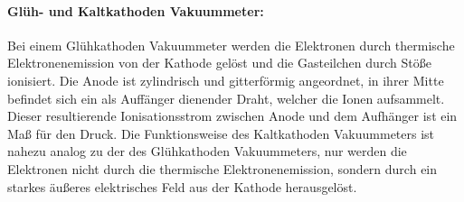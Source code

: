 \paragraph{Glüh- und Kaltkathoden Vakuummeter:}
Bei einem Glühkathoden Vakuummeter werden die Elektronen durch thermische Elektronenemission von der Kathode gelöst und die Gasteilchen durch Stöße ionisiert. Die
Anode ist zylindrisch und gitterförmig angeordnet, in ihrer Mitte befindet sich ein als Auffänger dienender Draht, welcher die Ionen aufsammelt. Dieser resultierende
Ionisationsstrom zwischen Anode und dem Aufhänger ist ein Maß für den Druck.
Die Funktionsweise des Kaltkathoden Vakuummeters ist nahezu analog zu der des Glühkathoden Vakuummeters, nur werden die Elektronen nicht durch die thermische Elektronenemission,
sondern durch ein starkes äußeres elektrisches Feld aus der Kathode herausgelöst.
